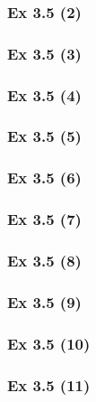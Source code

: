 \subsubsection{Ex 3.5 (2)}\label{sec:Ex_3.5.2}

\subsubsection{Ex 3.5 (3)}\label{sec:Ex_3.5.3}

\subsubsection{Ex 3.5 (4)}\label{sec:Ex_3.5.4}

\subsubsection{Ex 3.5 (5)}\label{sec:Ex_3.5.5}

\subsubsection{Ex 3.5 (6)}\label{sec:Ex_3.5.6}

\subsubsection{Ex 3.5 (7)}\label{sec:Ex_3.5.7}

\subsubsection{Ex 3.5 (8)}\label{sec:Ex_3.5.8}

\subsubsection{Ex 3.5 (9)}\label{sec:Ex_3.5.9}

\subsubsection{Ex 3.5 (10)}\label{sec:Ex_3.5.10}

\subsubsection{Ex 3.5 (11)}\label{sec:Ex_3.5.11}

